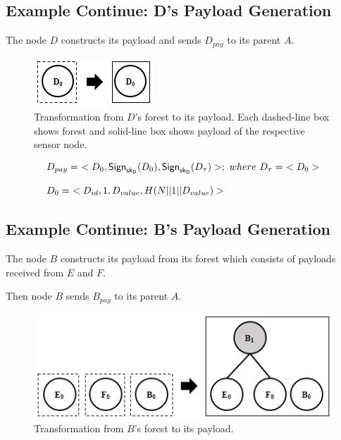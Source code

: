 \documentclass[%
  slidesonly,%
  semlayer%
  ]{seminar}                                  %
\newcommand{\sk}{\sf{sk}}
\begin{document}
\begin{slide}

    \subsection*{Example Continue: D's Payload Generation}
      The node $D$ constructs its payload and sends $D_{pay}$ to its parent $A$.
      
      \begin{figure}[h!]
        \centering
        \includegraphics[scale = 0.5]{images/d-forest-payload.png}
        \caption{Transformation from $D$'s forest to its payload.
            Each dashed-line box shows forest and solid-line box shows payload of the respective sensor node.}
        \label{fig:d-forest-payload}
      \end{figure}
      \begin{equation*}
        \begin{array}{l}
          D_{pay} =\ <D_{0}, \textsf{Sign}_{\sk_{D}}(D_{0}), \textsf{Sign}_{\sk_{D}}(D_{\tau})>;\ where\ D_{\tau} =\ <D_{0}>\\
          \\
          D_{0} =\ <D_{id},1,D_{value},H(N||1||D_{value})>
        \end{array}
      \end{equation*}


      \clearpage

    \subsection*{Example Continue: B's Payload Generation}  
      The node $B$ constructs its payload from its forest which consists of payloads received from $E$ and $F$.

      Then node $B$ sends $B_{pay}$ to its parent $A$.
      \begin{figure}[h!]
        \centering
        \includegraphics[scale = 0.5]{images/b-forest-payload.png}
        \caption{Transformation from $B$'s forest to its payload.}
        \label{fig:b-forest-payload}
      \end{figure}
      

\end{slide}
\end{document}
